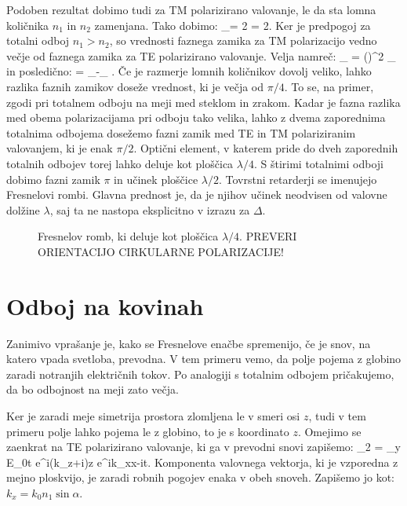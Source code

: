 Podoben rezultat dobimo tudi za TM polarizirano valovanje, le da sta lomna količnika $n_1$ in $n_2$
zamenjana. Tako dobimo:
\beq
\delta_= 2\arctan{} = 2\arctan{}.
\label{eq:04_86}
\eeq
Ker je predpogoj za totalni odboj $n_1 > n_2$, so vrednosti faznega zamika za 
TM polarizacijo vedno večje od faznega zamika za TE polarizirano
valovanje. Velja namreč:
\beq
\tan \delta_ = \left(\right)^2 \tan \delta_
\label{eq:04_87}
\eeq
in posledično:
\beq
\Delta = \delta_-\delta_ .
\label{eq:04_88}
\eeq
Če je razmerje lomnih količnikov dovolj veliko, lahko razlika faznih zamikov doseže vrednost, ki je
večja od $\pi/4$. To se, na primer, zgodi pri totalnem odboju na meji med steklom in zrakom. 
Kadar je fazna razlika med obema polarizacijama pri odboju tako velika, lahko  z dvema zaporednima
totalnima odbojema dosežemo fazni zamik med TE in TM polariziranim valovanjem, ki je enak $\pi/2$. 
Optični element, v katerem pride do dveh zaporednih totalnih odbojev torej lahko deluje kot ploščica
$\lambda/4$. S štirimi totalnimi odboji dobimo fazni zamik $\pi$ in učinek ploščice $\lambda/2$. Tovrstni
retarderji se imenujejo Fresnelovi rombi. Glavna prednost je, da je njihov učinek neodvisen od 
valovne dolžine $\lambda$, saj ta ne nastopa eksplicitno v izrazu za $\Delta$. 
\begin{figure}[ht]
\centering
\def\svgwidth{70truemm} 

\caption{Fresnelov romb, ki deluje kot ploščica $\lambda/4$. PREVERI ORIENTACIJO CIRKULARNE POLARIZACIJE!}
\label{fig:04_Fresneltot}
\end{figure}

\section{Odboj na kovinah}
Zanimivo vprašanje je, kako se Fresnelove enačbe spremenijo, če je snov, 
na katero vpada svetloba, prevodna. V tem primeru
vemo, da polje pojema z globino zaradi notranjih električnih tokov. 
Po analogiji s totalnim odbojem pričakujemo, da bo odbojnost na meji zato večja. 

Ker je zaradi meje simetrija prostora zlomljena le v smeri osi $z$, tudi v tem primeru polje
lahko pojema le z globino, to je s koordinato $z$. Omejimo se zaenkrat na TE polarizirano valovanje, ki 
ga v prevodni snovi zapišemo:
\beq
{}_2 = _y E_{0t} e^{i(k_z+i\varkappa)z} e^{ik_xx-i\omega t}.
\label{eq:04_89}
\eeq
Komponenta valovnega vektorja, ki je vzporedna z mejno ploskvijo, je zaradi
robnih pogojev enaka v obeh snoveh. Zapišemo jo kot: $k_x = k_0 n_1 \sin \alpha$. 

